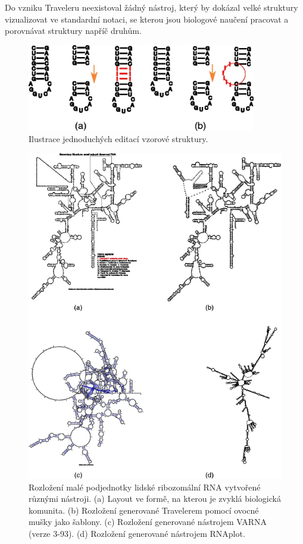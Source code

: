 Do vzniku Traveleru neexistoval žádný nástroj, který by dokázal velké struktury
vizualizovat ve standardní notaci, se kterou jsou biologové naučení pracovat a
porovnávat struktury napříč druhům.

\begin{figure}[H]
  \centering
  \includegraphics[width=100mm]{../img/kap01/traveler/editation.png}
  \caption[Ilustrace jednoduchých editací vzorové struktury]{Ilustrace
  jednoduchých editací vzorové struktury.\cite{Traveler2017}}
  \label{editshow}
\end{figure}

\begin{figure}[H]
  \centering
  \includegraphics[width=140mm]{../img/kap01/traveler/demo.png}
  \caption[Ukázka výsledku nástroje Traveler]{Rozložení malé podjednotky
  lidské ribozomální RNA vytvořené různými nástroji. (a) Layout ve formě, na
  kterou je zvyklá biologická komunita. (b) Rozložení generované Travelerem
  pomocí ovocné mušky jako šablony. (c) Rozložení generované nástrojem VARNA
  (verze 3-93). (d) Rozložení generované nástrojem
  RNAplot\cite{RNAplot}\cite{Traveler2017}.}
  \label{travelerdemo}
\end{figure}

